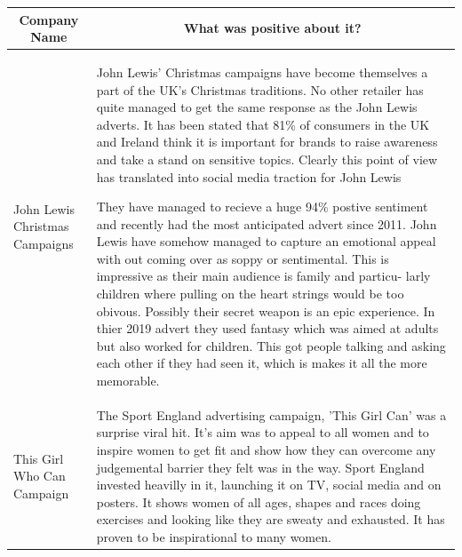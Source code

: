 \documentclass{article}
\begin{document}
\begin{table}[h!]
    \centering
    \begin{tabular}{|p{}|p{}|}
       \hline
       \multicolumn{1}{c}{\bfseries Company Name} & \multicolumn{1}{c}{\bfseries What was positive about it?}  \\
             \hline
         John Lewis Christmas Campaigns & John Lewis' Christmas campaigns have become themselves a part of the UK's Christmas traditions. No other retailer has quite managed to get the same response as the John Lewis adverts. It has been stated that 81\% of consumers in the UK and Ireland think it is important for brands to raise awareness and take a stand on sensitive topics. Clearly this point of view has translated into social media traction for John Lewis \cite{JohnLewisChristmasCampaigns}


They have managed to recieve a huge 94\% postive sentiment and recently had the most anticipated advert since 2011. \cite{JohnLewisPowerful}  John Lewis have somehow managed to capture an emotional appeal with out coming over as soppy or sentimental. This is impressive as their main audience is family and particu- larly children where pulling on the heart strings would be too obivous. Possibly their secret weapon is an epic experience.  In thier 2019 advert they used fantasy which was aimed at adults but also worked for children. This got people talking and asking each other if they had seen it, which is makes it all the more memorable. \cite{JohnLewisPowerful} \\
        \hline
	This Girl Who Can Campaign & The Sport England advertising campaign, 'This Girl Can' was a surprise viral hit. It's aim was to appeal to all women and to inspire women to get fit and show how they can overcome any judgemental barrier they felt was in the way. Sport England invested heavilly in it, launching it on TV, social media and on posters. It shows women of all ages, shapes and races doing exercises and looking like they are sweaty and exhausted. It has proven to be inspirational to many women. \cite{ThisGirlCan}\\
        \hline
    \end{tabular}

\end{table}
\end{document}
